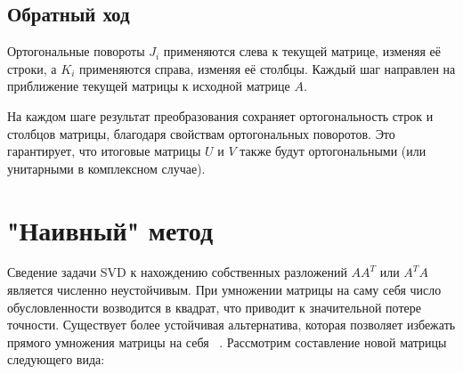\documentclass[12pt, a4paper]{report}
\theoremstyle{note}
\begin{document}
\subsection{Обратный ход}


Ортогональные повороты \( J_i \) применяются слева к текущей матрице, изменяя её строки, а \( K_i \) применяются справа, изменяя её столбцы. Каждый шаг направлен на приближение текущей матрицы к исходной матрице \( A \).

На каждом шаге результат преобразования сохраняет ортогональность строк и столбцов матрицы, благодаря свойствам ортогональных поворотов. Это гарантирует, что итоговые матрицы \( U \) и \( V \) также будут ортогональными (или унитарными в комплексном случае).


\newpage
\section{"Наивный" метод}


Сведение задачи SVD к нахождению собственных разложений \( A A^T \) или \( A^T A \) является численно неустойчивым. При умножении матрицы на саму себя число обусловленности возводится в квадрат, что приводит к значительной потере точности.
Существует более устойчивая альтернатива, которая позволяет избежать прямого умножения матрицы на себя ~\cite{mr3_algo4triagonal_sym_eigen_and_bidiagSVD}. Рассмотрим составление новой матрицы следующего вида:
\end{document}
